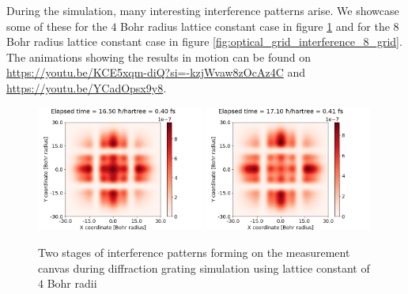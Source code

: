 During the simulation, many interesting interference patterns arise.
We showcase some of these for the $4$ Bohr radius lattice constant case in figure \ref{fig:optical_grid_interference} and for the $8$ Bohr radius lattice constant case in figure \ref{fig:optical_grid_interference_8_grid}.
The animations showing the results in motion can be found on \url{https://youtu.be/KCE5xqm-diQ?si=-kzjWvaw8zOcAz4C} and \url{https://youtu.be/YCadOpsx9y8}.
\begin{figure}
	\begin{center}
		\includegraphics[width=0.49\textwidth]{figures/optical_grid_interference_01.png}
		\includegraphics[width=0.49\textwidth]{figures/optical_grid_interference_02.png}
		\caption{Two stages of interference patterns forming on the measurement canvas during diffraction grating simulation using lattice constant of $4$ Bohr radii}
		\label{fig:optical_grid_interference}
	\end{center}	
\end{figure}
